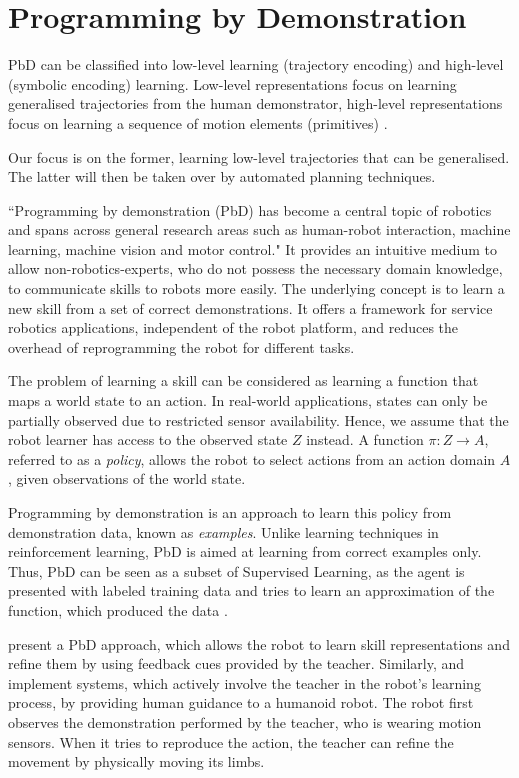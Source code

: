 \section{Programming by Demonstration}
PbD can be classified into low-level learning (trajectory encoding) and high-level (symbolic encoding) learning.
 Low-level representations focus on learning generalised trajectories from the human demonstrator, high-level representations focus on learning a sequence of motion elements (primitives) \cite{peppoloni2014ros}.

Our focus is on the former, learning low-level trajectories that can be generalised.
 The latter will then be taken over by automated planning techniques.

``Programming by demonstration (PbD) has become a central topic of robotics and spans across general research areas such as human-robot interaction, machine learning, machine vision and motor control." \cite{billard2008robot}
It provides an intuitive medium to allow non-robotics-experts, who do not possess the necessary domain knowledge, to communicate skills to robots more easily.
 The underlying concept is to learn a new skill from a set of correct demonstrations.
It offers a framework for service robotics applications, independent of the robot platform, and reduces the overhead of reprogramming the robot for different tasks.

The problem of learning a skill can be considered as learning a function that maps a world state to an action.
 In real-world applications, states can only be partially observed due to restricted sensor availability.
 Hence, we assume that the robot learner has access to the observed state $Z$ instead.
 A function $\pi : Z \rightarrow A$, referred to as a \textit{policy}, allows the robot to select actions from an action domain $A$, given observations of the world state.
 
Programming by demonstration is an approach to learn this policy from demonstration data, known as \textit{examples}.
Unlike learning techniques in reinforcement learning, PbD is aimed at learning from correct examples only.
 Thus, PbD can be seen as a subset of Supervised Learning, as the agent is presented with labeled training data and tries to learn an approximation of the function, which produced the data \cite{argall2009survey}.

 \cite{nicolescu2003natural} present a PbD approach, which allows the robot to learn skill representations and refine them by using feedback cues provided by the teacher.
 Similarly, \cite{calinon2007active} and \cite{calinon2007incremental} implement systems, which actively involve the teacher in the robot's learning process, by providing human guidance to a humanoid robot.
 The robot first observes the demonstration performed by the teacher, who is wearing motion sensors.
 When it tries to reproduce the action, the teacher can refine the movement by physically moving its limbs.

